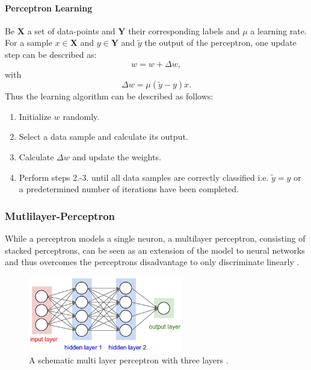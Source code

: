 \paragraph{Perceptron Learning} \label{c:perlearning}

Be $\textbf{X}$ a set of data-points and $\textbf{Y}$ their corresponding labels and $\mu$ a learning rate. 
For a sample $x \in \textbf{X}$  and $y \in \textbf{Y}$ and $\tilde{y}$ the output of the perceptron, one update step can be described as:
\[ 
	w = w + \Delta w,
\]
with 
\[
	\Delta w = \mu (\tilde{y}-y) x .
\]
Thus the learning algorithm can be described as follows:

\begin{enumerate}
	\item Initialize $w$ randomly.
	\item Select a data sample and calculate its output.
	\item Calculate $\Delta w$ and update the weights.
	\item Perform steps 2.-3. until all data samples are correctly classified i.e. $\tilde{y} = y$ or a predetermined number of iterations have been completed.
\end{enumerate}


\subsubsection{Mutlilayer-Perceptron} \label{c:mlp}

While a perceptron models a single neuron, a multilayer perceptron, consisting of stacked perceptrons, can be seen as an extension of the model to neural networks and thus overcomes the perceptrons disadvantage to only discriminate linearly \cite{Goodfellow-et-al-2016-Book}\cite{rumelhart1985learning}. 

\begin{figure}
	\centering
    	\includegraphics[width=0.6\textwidth]{imgs/mlp.jpeg} 
    \caption{A schematic multi layer perceptron with three layers \cite{mlpImg}.}
	\label{fig:mlp}
\end{figure}



